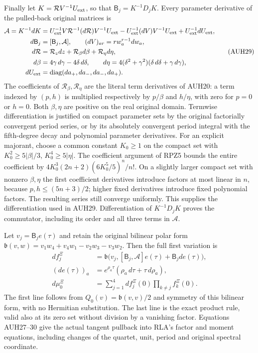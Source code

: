 Finally let $K=\mathcal RV^{-1}U_{\rm ext}$, so that
$\mathsf B_j=K^{-1}D_jK$.
Every parameter derivative of the pulled-back original matrices is
\[
\begin{aligned}
 \mathcal A=K^{-1}dK
 &=U_{\rm ext}^{-1}V\mathcal R^{-1}(d\mathcal R)V^{-1}U_{\rm ext}
   -U_{\rm ext}^{-1}(dV)V^{-1}U_{\rm ext}
   +U_{\rm ext}^{-1}dU_{\rm ext},\\
 d\mathsf B_j&=[\mathsf B_j,\mathcal A],\qquad
 (dV)_{ar}=r w_a^{r-1}dw_a,\\
 d\mathcal R&=\mathcal R_zdz+\mathcal R_\beta d\beta+
                                    \mathcal R_\eta d\eta,\\
 d\beta&=4\gamma\,d\gamma-4\delta\,d\delta,\qquad
 d\eta=4(\delta^2+\gamma^2)(\delta\,d\delta+\gamma\,d\gamma),\\
 dU_{\rm ext}&=\operatorname{diag}(da_+,da_-,da_-,da_+).
\end{aligned}\tag{AUH29}
\]
The coefficients of $\mathcal R_\beta,\mathcal R_\eta$ are the
literal term derivatives of AUH20: a term indexed by $(p,h)$ is
multiplied respectively by $p/\beta$ and $h/\eta$, with zero
for $p=0$ or $h=0$.
Both $\beta,\eta$ are positive on the real original domain.
Termwise differentiation is justified on compact parameter sets by
the original factorially convergent period series, or by its
absolutely convergent period integral with the fifth-degree decay
and polynomial parameter derivatives.  For an explicit majorant,
choose a common constant $K_0\ge1$ on the compact set with
$K_0^2\ge5|\beta|/3$, $K_0^4\ge5|\eta|$.
The coefficient argument of RPZ5 \cite{RPZ005} bounds the entire coefficient
by $4K_0^3(2n+2)(6K_0^5/5)^n/n!$.
On a slightly larger compact set with nonzero $\beta,\eta$ the
first coefficient derivatives introduce factors at most linear in
$n$, because $p,h\le(5n+3)/2$; higher fixed derivatives introduce
fixed polynomial factors.  The resulting series still converge
uniformly.  This supplies the differentiation used in AUH29.
Differentiation of $K^{-1}D_jK$ proves the commutator, including
its order and all three terms in $\mathcal A$.

Let $v_j=\mathsf B_je(\tau)$ and retain the original bilinear
polar form
$\mathfrak b(v,w)=v_1w_4+v_4w_1-v_2w_3-v_3w_2$.
Then the full first variation is
\[
\begin{aligned}
 df_j^{\Xi}&=\mathfrak b\bigl(v_j,
        [\mathsf B_j,\mathcal A]e(\tau)+\mathsf B_jde(\tau)\bigr),\\
 (de(\tau))_a&=e^{\rho_a\tau}(\rho_a\,d\tau+\tau\,d\rho_a),\\
 d\mu_0^{\Xi}&=\sum_{j=1}^4df_j^{\Xi}(0)
                               \prod_{k\ne j}f_k^{\Xi}(0).
\end{aligned}\tag{AUH30}
\]
The first line follows from $Q_0(v)=\mathfrak b(v,v)/2$ and
symmetry of this bilinear form, with no Hermitian substitution.
The last line is the exact product rule, valid also at its zero
set without division by a vanishing factor.
Equations AUH27--30 give the actual tangent pullback into RLA's
factor and moment equations, including changes of the quartet,
unit, period and original spectral coordinate.

